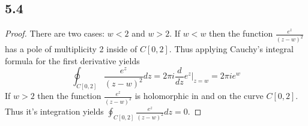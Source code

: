 \documentclass[a4paper, 11pt]{article}
\begin{document}
	
\subsection*{5.4}
	\begin{proof}
		There are two cases: $w<2$ and $w>2$. If $w<w$ then the function $\frac{e^z}{(z-w)^2}$ has a pole of multiplicity 2 inside of $C[0,2]$. Thus applying Cauchy's integral formula for the first derivative yields
			\begin{equation*}
				\oint_{C[0,2]} \frac{e^z}{(z-w)^2}dz = 2\pi i \frac{d}{dz}e^z \big|_{z=w} = 2\pi i e^w 
			\end{equation*}
		\noindent If $w>2$ then the function $\frac{e^z}{(z-w)^2}$ is holomorphic in and on the curve ${C[0,2]}$. Thus it's integration yields $\oint_{C[0,2]}\frac{e^z}{(z-w)^2}dz = 0$. 
	\end{proof}
	
	
\end{document}
